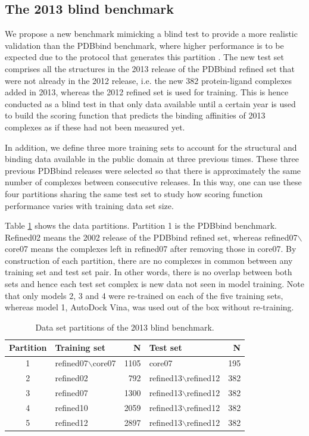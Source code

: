 \subsection{The 2013 blind benchmark}

We propose a new benchmark mimicking a blind test to provide a more realistic validation than the PDBbind benchmark, where higher performance is to be expected due to the protocol that generates this partition \citep{908}. The new test set comprises all the structures in the 2013 release of the PDBbind refined set that were not already in the 2012 release, i.e. the new 382 protein-ligand complexes added in 2013, whereas the 2012 refined set is used for training. This is hence conducted as a blind test in that only data available until a certain year is used to build the scoring function that predicts the binding affinities of 2013 complexes as if these had not been measured yet.

In addition, we define three more training sets to account for the structural and binding data available in the public domain at three previous times. These three previous PDBbind releases were selected so that there is approximately the same number of complexes between consecutive releases. In this way, one can use these four partitions sharing the same test set to study how scoring function performance varies with training data set size.

Table \ref{rfscore3:partitions} shows the data partitions. Partition 1 is the PDBbind benchmark. Refined02 means the 2002 release of the PDBbind refined set, whereas refined07$\backslash$core07 means the complexes left in refined07 after removing those in core07. By construction of each partition, there are no complexes in common between any training set and test set pair. In other words, there is no overlap between both sets and hence each test set complex is new data not seen in model training. Note that only models 2, 3 and 4 were re-trained on each of the five training sets, whereas model 1, AutoDock Vina, was used out of the box without re-training.

\begin{table}
\caption{Data set partitions of the 2013 blind benchmark.}
\label{rfscore3:partitions}
\begin{tabular}{clrlr}
\hline
Partition & Training set & N & Test set & N\\
\hline
1 & refined07$\backslash$core07 & 1105 & core07                         & 195\\
2 & refined02                   &  792 & refined13$\backslash$refined12 & 382\\
3 & refined07                   & 1300 & refined13$\backslash$refined12 & 382\\
4 & refined10                   & 2059 & refined13$\backslash$refined12 & 382\\
5 & refined12                   & 2897 & refined13$\backslash$refined12 & 382\\
\hline
\end{tabular}
\end{table}

